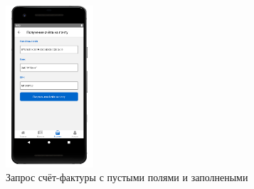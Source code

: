 \begin{figure}[!htb]
\begin{minipage}{0.24\textwidth}
        \includegraphics[height=6cm]
        {images/mobile/order/order-check-4.png}
    \end{minipage}

    \caption{Запрос счёт-фактуры с пустыми полями и заполнеными}
    \label{fig:test_order_check}
\end{figure}

